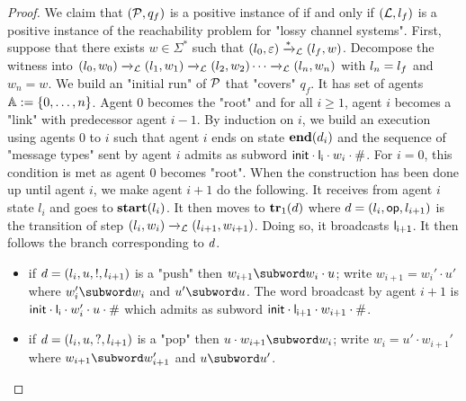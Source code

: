 \begin{proof}
	We claim that $(\mathcal{P}, q_f)$ is a positive instance of \COVER if and only if $(\mathcal{L}, l_f)$ is a positive instance of the reachability problem for "lossy channel systems".
	First, suppose that there exists $w \in \Sigma^*$ such that $(l_0, \varepsilon) \xrightarrow{*}_{\mathcal{L}} (l_f, w)$. Decompose the witness into $(l_0, w_0) \xrightarrow{}_{\mathcal{L}} (l_1, w_1) \xrightarrow{}_{\mathcal{L}} (l_2, w_2) \cdots \xrightarrow{}_{\mathcal{L}} (l_n,w_n)$ with $l_n = l_f$ and $w_n =w$. 
	We build an "initial run" of $\mathcal{P}$ that "covers" $q_f$. It has set of agents $\mathbb{A} := \{0,\dots, n\}$. Agent $0$ becomes the "root" and for all $i \geq 1$, agent $i$ becomes a "link" with predecessor agent $i-1$. By induction on $i$, we build an execution using agents $0$ to $i$ such that agent $i$ ends on state $\mathbf{end}(d_i)$ and the sequence of "message types" sent by agent $i$ admits as subword $\mathsf{init} \cdot \mathsf{l_i} \cdot w_i \cdot \mathsf{\#}$. For $i=0$, this condition is met as agent $0$ becomes "root". When the construction has been done up until agent $i$, we make agent $i+1$ do the following. It receives from agent $i$ state $l_i$ and goes to $\mathbf{start}(l_i)$. It then moves to $\mathbf{tr}_1(d)$ where $d = (l_i, \mathsf{op}, l_{i+1})$ is the transition of step $(l_i, w_i) \xrightarrow{}_{\mathcal{L}} (l_{i+1}, w_{i+1})$. Doing so, it broadcasts $\mathsf{l_{i+1}}$. It then follows the branch corresponding to $d$. 
	\begin{itemize}
		\item if $d =(l_i, u,!, l_{i+1})$ is a "push" then $w_{i+1} \subword w_i \cdot u$; write $w_{i+1} = w_{i}' \cdot u'$ where $w_i' \subword w_i$ and $u' \subword u$. 
		The word broadcast by agent $i+1$ is $\mathsf{init} \cdot \mathsf{l_i} \cdot w'_i \cdot u \cdot \mathsf{\#}$ which admits as subword $\mathsf{init} \cdot \mathsf{l_{i+1}} \cdot w_{i+1} \cdot \mathsf{\#}$.
		\item if $d =(l_i, u,?, l_{i+1})$ is a "pop" then $u \cdot w_{i+1} \subword w_i$; write $w_{i} = u' \cdot w_{i+1}'$ where $w_{i+1} \subword w_{i+1}'$ and $u \subword u'$. 

\end{itemize}
\end{proof}

